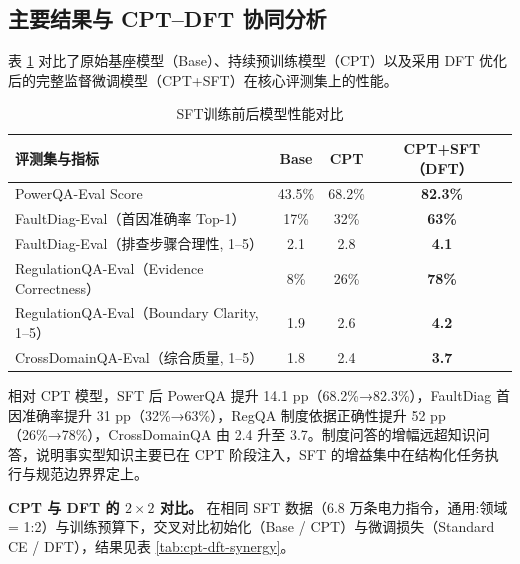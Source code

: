 \documentclass[fontset=fandol,type=master,campus=shenzhen,etitleauto=true]{hithesisbook}
\begin{document}
\subsection{主要结果与 CPT--DFT 协同分析}\label{ux4e3bux8981ux7ed3ux679c-2}

表 \ref{tab:sft-results} 对比了原始基座模型（Base）、持续预训练模型（CPT）以及采用 DFT 优化后的完整监督微调模型（CPT+SFT）在核心评测集上的性能。

\begin{table}[htbp]
\centering
\caption{SFT训练前后模型性能对比}
\label{tab:sft-results}
\small
\begin{tabular}{l c c c}
\toprule
\textbf{评测集与指标} & \textbf{Base} & \textbf{CPT} & \textbf{CPT+SFT（DFT）} \\
\midrule
PowerQA-Eval Score & 43.5\% & 68.2\% & \textbf{82.3\%} \\
FaultDiag-Eval（首因准确率 Top-1） & 17\% & 32\% & \textbf{63\%} \\
FaultDiag-Eval（排查步骤合理性, 1--5） & 2.1 & 2.8 & \textbf{4.1} \\
RegulationQA-Eval（Evidence Correctness） & 8\% & 26\% & \textbf{78\%} \\
RegulationQA-Eval（Boundary Clarity, 1--5） & 1.9 & 2.6 & \textbf{4.2} \\
CrossDomainQA-Eval（综合质量, 1--5） & 1.8 & 2.4 & \textbf{3.7} \\
\bottomrule
\end{tabular}
\end{table}

相对 CPT 模型，SFT 后 PowerQA 提升 14.1 pp（68.2\%→82.3\%），FaultDiag 首因准确率提升 31 pp（32\%→63\%），RegQA 制度依据正确性提升 52 pp（26\%→78\%），CrossDomainQA 由 2.4 升至 3.7。制度问答的增幅远超知识问答，说明事实型知识主要已在 CPT 阶段注入，SFT 的增益集中在结构化任务执行与规范边界界定上。

\textbf{CPT 与 DFT 的 $2 \times 2$ 对比。} 在相同 SFT 数据（6.8 万条电力指令，通用:领域 = 1:2）与训练预算下，交叉对比初始化（Base / CPT）与微调损失（Standard CE / DFT），结果见表 \ref{tab:cpt-dft-synergy}。
\end{document}
